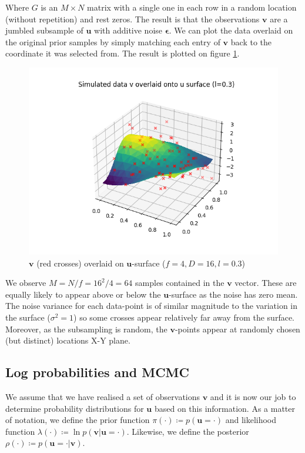 \documentclass[]{article}
\newcommand{\figwidth}{0.6\linewidth}
\newcommand{\lik}{\lambda}
\newcommand{\ubold}{\boldsymbol{u}}
\newcommand{\vbold}{\boldsymbol{v}}
\newcommand{\epsbold}{\boldsymbol{\epsilon}}
\begin{document}
Where $G$ is an $M \times N$ matrix with a single one in each row in a random location (without repetition) and rest zeros. The result is that the observations $\vbold$ are a jumbled subsample of $\ubold$ with additive noise $\epsbold$. We can plot the data overlaid on the original prior samples by simply matching each entry of $\vbold$ back to the coordinate it was selected from. The result is plotted on figure \ref{fig:v-on-u}.
%
\begin{figure}[!h]
	\centering
	\includegraphics[width=\figwidth]{v-overlay.png}
	\caption{$\vbold$ (red crosses) overlaid on $\ubold$-surface ($f=4, D=16, l=0.3$)}
	\label{fig:v-on-u}
\end{figure}

We observe $M=N/f=16^2/4=64$ samples contained in the $\vbold$ vector. These are equally likely to appear above or below the $\ubold$-surface as the noise has zero mean. The noise variance for each data-point is of similar magnitude to the variation in the surface ($\sigma^2 = 1$) so some crosses appear relatively far away from the surface. Moreover, as the subsampling is random, the $\vbold$-points appear at randomly chosen (but distinct) locations X-Y plane.

\subsection{Log probabilities and MCMC}

We assume that we have realised a set of observations $\vbold$ and it is now our job to determine probability distributions for $\ubold$ based on this information. As a matter of notation, we define the prior function $\pi(\cdot) \coloneqq p(\ubold=\cdot)$ and likelihood function $\lik(\cdot) \coloneqq \ln p (\vbold | \ubold = \cdot)$. Likewise, we define the posterior $\rho(\cdot) \coloneqq p(\ubold=\cdot | \vbold)$.
\end{document}
